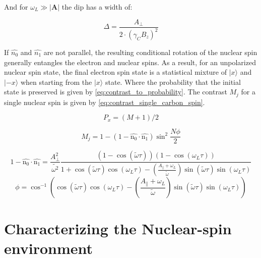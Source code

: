 And for $\omega_L \gg |\bm{A}|$ the dip has a width of:

 \begin{equation}
\Delta = \frac{A_\perp}{2\cdot (\gamma_C B_z)^2}
\label{eq:res_dip_width}
\end{equation}

If  $\hat{n_0}$ and $\hat{n_1}$ are not parallel, the resulting conditional rotation of the nuclear spin generally entangles the electron and nuclear spins. As a result, for an unpolarized nuclear spin state, the final electron spin state is a statistical mixture of $|x\rangle$ and $|-x\rangle$ when starting from the $|x\rangle$  state. Where the probability that the initial state is preserved is given by \cref{eq:contrast_to_probability}. The contrast $M_j$ for a single nuclear spin is given by \cref{eq:contrast_single_carbon_spin}\citep{Taminiau2012Detection}.

\begin{equation}
\label{eq:contrast_to_probability}
P_x = (M+1)/2
\end{equation}

\begin{equation}
\label{eq:contrast_single_carbon_spin}
M_j = 1-(1 - \hat{\bm{\mathrm{n_0}}} \cdot \hat{\bm{\mathrm{n_1}}}) \sin^2 \frac{N\phi}{2}
\end{equation}

\begin{equation}
\label{eq:vec_term}
    1 - \hat{\bm{\mathrm{n_0}}} \cdot \hat{\bm{\mathrm{n_1}}} =  \frac{A_\perp ^2}{\tilde{\omega^2}} \frac{(1- \cos{(\tilde{\omega} \tau)})(1-\cos{(\omega_L \tau)})} {1 +\cos{(\tilde{\omega} \tau)}\cos{(\omega_L \tau)} - (\frac{ A_ \parallel + \omega_L }{ \tilde{ \omega}}) \sin{(\tilde{\omega} \tau)}\sin{(\omega_L \tau)}}
\end{equation}
\begin{equation}
\label{eq:angle_term}
    \phi =  \cos^{-1}\left(\cos(\tilde{\omega} \tau) \cos(\omega_L \tau)-\left(\frac{ A_ \parallel + \omega_L }{ \tilde{ \omega}}\right) \sin(\tilde{\omega} \tau)\sin(\omega_L \tau)\right)
\end{equation}

\section{Characterizing the Nuclear-spin environment}
